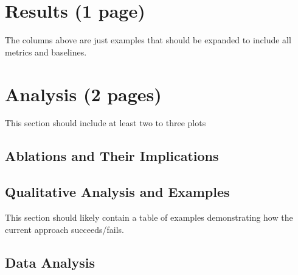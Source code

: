 \documentclass[11pt,a4paper]{article}
\begin{document}
\section{Results (1 page)}
The columns above are just examples that should be expanded to include all metrics and baselines.

\clearpage
\section{Analysis (2 pages)}
This section should include at least two to three plots
\subsection{Ablations and Their Implications}

\subsection{Qualitative Analysis and Examples}
This section should likely contain a table of examples demonstrating how the current approach succeeds/fails.




\clearpage

\begin{appendices}
\section{Data Analysis}
\label{appendix:A}


\end{appendices}
\end{document}
